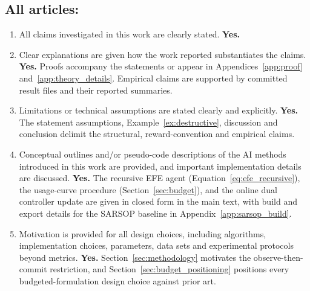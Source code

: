 \documentclass[manuscript, screen, review]{jair}
\begin{document}
\subsection*{All articles:}
\begin{enumerate}
\item All claims investigated in this work are clearly stated. \textbf{Yes.}
\item Clear explanations are given how the work reported substantiates the claims. \textbf{Yes.} Proofs accompany the statements or appear in Appendices~\ref{app:proof} and~\ref{app:theory_details}. Empirical claims are supported by committed result files and their reported summaries.
\item Limitations or technical assumptions are stated clearly and explicitly. \textbf{Yes.} The statement assumptions, Example~\ref{ex:destructive}, discussion and conclusion delimit the structural, reward-convention and empirical claims.
\item Conceptual outlines and/or pseudo-code descriptions of the AI methods introduced in this work are provided, and important implementation details are discussed. \textbf{Yes.} The recursive EFE agent (Equation~\ref{eq:efe_recursive}), the usage-curve procedure (Section~\ref{sec:budget}), and the online dual controller update are given in closed form in the main text, with build and export details for the SARSOP baseline in Appendix~\ref{app:sarsop_build}.
\item Motivation is provided for all design choices, including algorithms, implementation choices, parameters, data sets and experimental protocols beyond metrics. \textbf{Yes.} Section~\ref{sec:methodology} motivates the observe-then-commit restriction, and Section~\ref{sec:budget_positioning} positions every budgeted-formulation design choice against prior art.
\end{enumerate}
\end{document}
